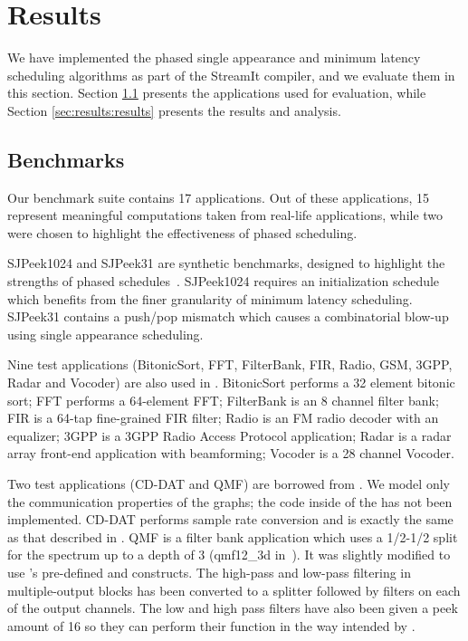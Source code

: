 \section{Results}
\label{chpt:results}

We have implemented the phased single appearance and minimum latency
scheduling algorithms as part of the StreamIt compiler, and we
evaluate them in this section.  Section \ref{sec:results:apps}
presents the applications used for evaluation, while Section
\ref{sec:results:results} presents the results and analysis.

\subsection{Benchmarks}
\label{sec:results:apps}

Our benchmark suite contains 17 applications. Out of these
applications, 15 represent meaningful computations taken from
real-life applications, while two were chosen to highlight the
effectiveness of phased scheduling.

SJPeek1024 and SJPeek31 are synthetic benchmarks, designed to
highlight the strengths of phased schedules~\cite{karczma-thesis}.
SJPeek1024 requires an initialization schedule which benefits from the
finer granularity of minimum latency scheduling. SJPeek31 contains a
push/pop mismatch which causes a combinatorial blow-up using single
appearance scheduling.

Nine test applications (BitonicSort, FFT, FilterBank, FIR, Radio, GSM,
3GPP, Radar and Vocoder) are also used in \cite{Gordo02}. BitonicSort
performs a 32 element bitonic sort; FFT performs a 64-element FFT;
FilterBank is an 8 channel filter bank; FIR is a 64-tap fine-grained
FIR filter; Radio is an FM radio decoder with an equalizer; 3GPP is a
3GPP Radio Access Protocol application; Radar is a radar array
front-end application with beamforming; Vocoder is a 28 channel
Vocoder.

Two test applications (CD-DAT and QMF) are borrowed from
\cite{murt2000x2}. We model only the communication properties of the
graphs; the code inside of the {\filters} has not been implemented.
CD-DAT performs sample rate conversion and is exactly the same as that
described in \cite{murt2000x2}.  QMF is a filter bank application
which uses a 1/2-1/2 split for the spectrum up to a depth of 3
(qmf12\_3d in~\cite{murt2000x2}).  It was slightly modified to use
{\StreamIt}'s pre-defined {\splitter} and {\joiner} constructs.  The
high-pass and low-pass filtering in multiple-output blocks has been
converted to a splitter followed by filters on each of the output
channels. The low and high pass filters have also been given a peek
amount of 16 so they can perform their function in the way intended by
{\StreamIt}.

